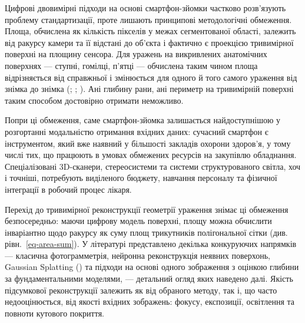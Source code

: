 \documentclass[
  ukrainian,
  10pt,
  a4paper,
  twocolumn]{article}
\begin{document}
Цифрові двовимірні підходи на основі смартфон-зйомки частково
розв'язують проблему стандартизації, проте лишають принципові
методологічні обмеження. Площа, обчислена як кількість пікселів у межах
сегментованої області, залежить від ракурсу камери та її відстані до
об'єкта і фактично є проекцією тривимірної поверхні на площину сенсора.
Для уражень на викривлених анатомічних поверхнях --- ступні, гомілці,
п'ятці --- обчислена таким чином площа відрізняється від справжньої і
змінюється для одного й того самого ураження від знімка до знімка
(;
;
). Ані глибину
рани, ані периметр на тривимірній поверхні таким способом достовірно
отримати неможливо.

Попри ці обмеження, саме смартфон-зйомка залишається найдоступнішою у
розгортанні модальністю отримання вхідних даних: сучасний смартфон є
інструментом, який вже наявний у більшості закладів охорони здоров'я, у
тому числі тих, що працюють в умовах обмежених ресурсів на закупівлю
обладнання. Спеціалізовані 3D-сканери, стереосистеми та системи
структурованого світла, хоч і точніші, потребують виділеного бюджету,
навчання персоналу та фізичної інтеграції в робочий процес лікаря.

Перехід до тривимірної реконструкції геометрії ураження знімає ці
обмеження безпосередньо: маючи цифрову модель поверхні, площу можна
обчислити інваріантно щодо ракурсу як суму площ трикутників
полігональної сітки (див. рівн.~\ref{eq-area-sum}). У літературі
представлено декілька конкуруючих напрямків --- класична фотограмметрія,
нейронна реконструкція неявних поверхонь, Gaussian Splatting
() та підходи на основі
одного зображення з оцінкою глибини за фундаментальними моделями, ---
детальний огляд яких наведено далі. Якість підсумкової реконструкції
залежить як від обраного методу, так і, що часто недооцінюється, від
якості вхідних зображень: фокусу, експозиції, освітлення та повноти
кутового покриття.
\end{document}
